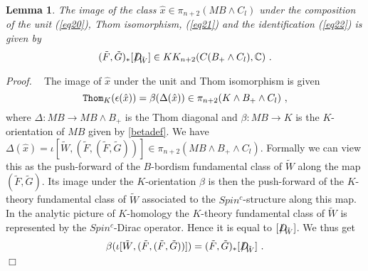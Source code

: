 \documentclass[12pt]{article}
\newtheorem{lem}[theorem]{Lemma}
\newcommand{\Thom}{{\tt Thom}}
\def\hB{\hspace*{\fill}$\Box$ \newline\noindent}
\newcommand{\proof}{{\it Proof.$\:\:\:\:$}}
\newcommand{\C}{{\mathbb{C}}}
\newcommand{\Dirac}{{D\hspace{-0.27cm}/}}
\begin{document}
\begin{lem}\label{lem9991}
The image of the class $\hat x\in \pi_{n+2}(MB\wedge C_{l})$
under the composition of the unit (\ref{eq20}), Thom isomorphism, (\ref{eq21}) and the identification (\ref{eq22}) is given by 
 $$(\tilde F,\tilde G)_{*}[\Dirac_{\tilde W}]\in KK_{n+2}(C(B_{+}\wedge C_{l}),\C)\ .$$ 
 \end{lem}
 \proof
The image of $\hat x$ under the unit and Thom isomorphism is given 
$$\Thom_{K}(\epsilon(\hat x))=\beta(\Delta(\hat x)) \in \pi_{n+2}(K\wedge B_{+}\wedge C_{l})\ ,$$
where
$\Delta:MB\to MB\wedge B_{+}$ is the Thom diagonal and
$\beta:MB\to K$  
 is the $K$-orientation of $MB$ given by \eqref{betadef}.
We have $\Delta(\hat x)=\iota[\tilde W,(\tilde F,(\tilde F,\tilde G))]\in \pi_{n+2}(MB\wedge B_{+}\wedge C_{l})$.
Formally we can view this as the push-forward of the $B$-bordism fundamental class of $\tilde W$
along the map $(\tilde F,\tilde G)$. Its image under the $K$-orientation $\beta$ is then the push-forward of the $K$-theory fundamental class of $\tilde W$ associated to the $Spin^{c}$-structure along this map. In the analytic picture of $K$-homology  the  $K$-theory fundamental class of $\tilde W$ is represented by the $Spin^{c}$-Dirac operator. Hence  it is equal to $[\Dirac_{\tilde W}]$.
We thus get
$$ \beta(\iota[\tilde W,(\tilde F,(\tilde F,\tilde G))])= (\tilde F,\tilde G)_{*}[\Dirac_{\tilde W}]\ .$$
\hB 



 
 
\end{document}
